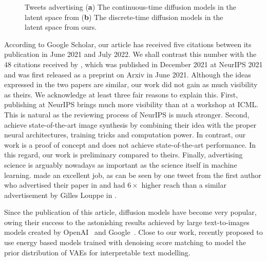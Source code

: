 \begin{figure}
\begin{subfigure}[b]{.48\textwidth}
    \caption{}
    \label{fig:discrete_tweet}
  \end{subfigure}
  \caption{Tweets advertising (\textbf{a}) The continuous-time diffusion models in the latent space from \citet{vahdat2021score} (\textbf{b}) The discrete-time diffusion models in the latent space from ours.}
\end{figure}

According to Google Scholar, our article has received five citations between its publication in June 2021 and July 2022. We shall contrast this number with the 48 citations received by \citet{vahdat2021score}, which was published in December 2021 at NeurIPS 2021 and was first released as a preprint on Arxiv in June 2021. Although the ideas expressed in the two papers are similar, our work did not gain as much visibility as theirs. We acknowledge at least three fair reasons to explain this. First, publishing at NeurIPS brings much more visibility than at a workshop at ICML. This is natural as the reviewing process of NeurIPS is much stronger. Second, \citet{vahdat2021score} achieve state-of-the-art image synthesis by combining their idea with the proper neural architectures, training tricks and computation power.
In contrast, our work is a proof of concept and does not achieve state-of-the-art performance. In this regard, our work is preliminary compared to theirs. Finally, advertising science is arguably nowadays as important as the science itself in machine learning.\citet{vahdat2021score} made an excellent job, as can be seen by one tweet from the first author who advertised their paper in  and had $6\times$ higher reach than a similar advertisement by Gilles Louppe in .

Since the publication of this article, diffusion models have become very popular, owing their success to the astonishing results achieved by large text-to-images models created by OpenAI~\citep[$\text{DALL}\cdot\text{E} 2$][]{ramesh2022hierarchical} and Google~\citep[Imagen][]{saharia2022photorealistic}. Close to our work, \citet{yu2022latent} recently proposed to use energy based models trained with denoising score matching to model the prior distribution of VAEs for interpretable text modelling.

